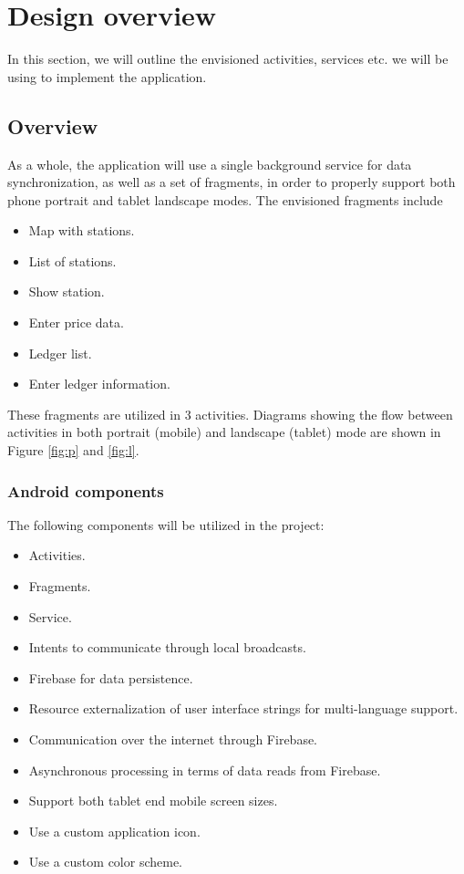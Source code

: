 
\chapter{Design overview}
In this section, we will outline the envisioned activities, services etc. we will be using to implement the application.

\section{Overview}
As a whole, the application will use a single background service for data synchronization, as well as a set of fragments, in order to properly support both phone portrait and tablet landscape modes. The envisioned fragments include
\begin{itemize}
	\item Map with stations.
	\item List of stations.
	\item Show station.
	\item Enter price data.
	\item Ledger list.
	\item Enter ledger information.
\end{itemize}

These fragments are utilized in 3 activities.  Diagrams showing the flow between activities in both portrait (mobile) and landscape (tablet) mode are shown in Figure \ref{fig:p} and \ref{fig:l}.

\subsection{Android components}
The following components will be utilized in the project:
\begin{itemize}
	\item Activities.
	\item Fragments.
	\item Service.
	\item Intents to communicate through local broadcasts.
	\item Firebase for data persistence.
	\item Resource externalization of user interface strings for multi-language support.
	\item Communication over the internet through Firebase.
	\item Asynchronous processing in terms of data reads from Firebase.
	\item Support both tablet end mobile screen sizes.
	\item Use a custom application icon.
	\item Use a custom color scheme.
\end{itemize}

